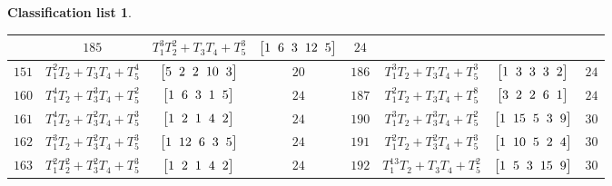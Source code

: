 \documentclass[pdftex]{sigma}%
\theoremstyle{definition}
\newtheorem{class-list}[thm]{Classification list}
\numberwithin{equation}{section}
\begin{document}
\begin{class-list}
\begin{table}[t!]
\begin{tabu}{c|c|c|c||c|c|c|c}
&${185}$&${T_{1}^{3}T_{2}^{2}+T_{3}T_{4}+T_{5}^{3}}$
&$\arraycolsep=1mm\begin{bmatrix}{1} & {6} & {3} & {12} & {5}\end{bmatrix}$&${24}$
\\
\hline
${151}$&${T_{1}^{2}T_{2}+T_{3}T_{4}+T_{5}^{4}}$
&$\arraycolsep=1mm\begin{bmatrix}{5} & {2} & {2} & {10} & {3}\end{bmatrix}$&${20}$
&${186}$&${T_{1}^{3}T_{2}+T_{3}T_{4}+T_{5}^{3}}$
&$\arraycolsep=1mm\begin{bmatrix}{1} & {3} & {3} & {3} & {2}\end{bmatrix}$&${24}$
\\
\hline
${160}$&${T_{1}^{4}T_{2}+T_{3}^{3}T_{4}+T_{5}^{2}}$
&$\arraycolsep=1mm\begin{bmatrix}{1} & {6} & {3} & {1} & {5}\end{bmatrix}$&${24}$
&${187}$&${T_{1}^{2}T_{2}+T_{3}T_{4}+T_{5}^{8}}$
&$\arraycolsep=1mm\begin{bmatrix}{3} & {2} & {2} & {6} & {1}\end{bmatrix}$&${24}$
\\
\hline
${161}$&${T_{1}^{4}T_{2}+T_{3}^{2}T_{4}+T_{5}^{3}}$
&$\arraycolsep=1mm\begin{bmatrix}{1} & {2} & {1} & {4} & {2}\end{bmatrix}$&${24}$
&${190}$&${T_{1}^{3}T_{2}+T_{3}^{3}T_{4}+T_{5}^{2}}$
&$\arraycolsep=1mm\begin{bmatrix}{1} & {15} & {5} & {3} & {9}\end{bmatrix}$&${30}$
\\
\hline
${162}$&${T_{1}^{3}T_{2}+T_{3}^{2}T_{4}+T_{5}^{3}}$
&$\arraycolsep=1mm\begin{bmatrix}{1} & {12} & {6} & {3} & {5}\end{bmatrix}$&${24}$
&${191}$&${T_{1}^{2}T_{2}+T_{3}^{2}T_{4}+T_{5}^{3}}$
&$\arraycolsep=1mm\begin{bmatrix}{1} & {10} & {5} & {2} & {4}\end{bmatrix}$&${30}$
\\
\hline
${163}$&${T_{1}^{2}T_{2}^{2}+T_{3}^{2}T_{4}+T_{5}^{3}}$
&$\arraycolsep=1mm\begin{bmatrix}{1} & {2} & {1} & {4} & {2}\end{bmatrix}$&${24}$
&${192}$&${T_{1}^{13}T_{2}+T_{3}T_{4}+T_{5}^{2}}$
&$\arraycolsep=1mm\begin{bmatrix}{1} & {5} & {3} & {15} & {9}\end{bmatrix}$&${30}$
\\
\hline
\end{tabu}\vspace{-4mm}
\end{table}


\end{class-list}
\end{document}
